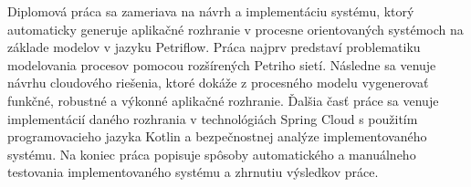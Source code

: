 Diplomová práca sa zameriava na návrh a implementáciu systému, ktorý automaticky generuje aplikačné rozhranie v procesne orientovaných systémoch na základe modelov v jazyku Petriflow.  
Práca najprv predstaví problematiku modelovania procesov pomocou rozšírených Petriho sietí. 
Následne sa venuje návrhu cloudového riešenia, ktoré dokáže z procesného modelu vygenerovať funkčné, robustné a výkonné aplikačné rozhranie. Ďalšia časť práce sa venuje implementácií daného rozhrania v technológiách Spring Cloud s použitím programovacieho jazyka Kotlin a bezpečnostnej analýze implementovaného systému. Na koniec práca popisuje spôsoby automatického a manuálneho testovania implementovaného systému a zhrnutiu výsledkov práce. 